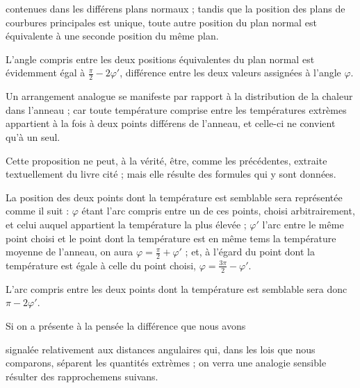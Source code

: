\documentclass[11pt,a4paper]{article}
\begin{document}

contenues dans les différens plans normaux ; tandis que la position des
plans de courbures principales est unique, toute autre position du plan
normal est équivalente à une seconde position du même plan.

L'angle compris entre les deux positions équivalentes du plan normal est
évidemment égal à $\frac{\pi}{2} - 2\varphi'$, différence entre les deux
valeurs assignées à l'angle $\varphi$.

Un arrangement analogue se manifeste par rapport à la distribution de la
chaleur dans l'anneau ; car toute température comprise entre les
températures extrèmes appartient à la fois à deux points différens de
l'anneau, et celle-ci ne convient qu'à un seul.

Cette proposition ne peut, à la vérité, être, comme les précédentes,
extraite textuellement du livre cité ; mais elle résulte des formules qui y
sont données.

La position des deux points dont la température est semblable sera
représentée comme il suit : $\varphi$ étant l'arc compris entre un de ces
points, choisi arbitrairement, et celui auquel appartient la température la
plus élevée ; $\varphi'$ l'arc entre le même point choisi et le point dont
la température est en même tems la température moyenne de l'anneau, on aura
$\varphi = \frac{\pi}{2} + \varphi'$ ; et, à l'égard du point dont la
température est égale à celle du point choisi,
$\varphi = \frac{3\pi}{2} - \varphi'$.

L'arc compris entre les deux points dont la température est semblable sera
donc $\pi - 2\varphi'$.

Si on a présente à la pensée la différence que nous avons

signalée relativement aux distances angulaires qui, dans les lois que nous
comparons, séparent les quantités extrèmes ; on verra une analogie sensible
résulter des rapprochemens suivans.
\end{document}
